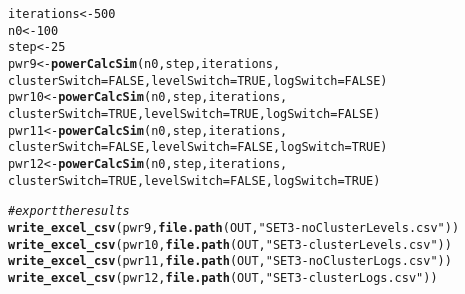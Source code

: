 \documentclass[10pt]{article}\usepackage[]{graphicx}\usepackage[]{color}
\makeatletter
\newcommand{\hlnum}[1]{\textcolor[rgb]{0.686,0.059,0.569}{#1}}%
\newcommand{\hlstr}[1]{\textcolor[rgb]{0.192,0.494,0.8}{#1}}%
\newcommand{\hlcom}[1]{\textcolor[rgb]{0.678,0.584,0.686}{\textit{#1}}}%
\newcommand{\hlstd}[1]{\textcolor[rgb]{0.345,0.345,0.345}{#1}}%
\newcommand{\hlkwb}[1]{\textcolor[rgb]{0.69,0.353,0.396}{#1}}%
\newcommand{\hlkwc}[1]{\textcolor[rgb]{0.333,0.667,0.333}{#1}}%
\newcommand{\hlkwd}[1]{\textcolor[rgb]{0.737,0.353,0.396}{\textbf{#1}}}%
\newenvironment{kframe}{%
 \def\at@end@of@kframe{}%
 \ifinner\ifhmode%
  \def\at@end@of@kframe{\end{minipage}}%
  \begin{minipage}{\columnwidth}%
 \fi\fi%
 \def\FrameCommand##1{\hskip\@totalleftmargin \hskip-\fboxsep
 \colorbox{shadecolor}{##1}\hskip-\fboxsep
     \hskip-\linewidth \hskip-\@totalleftmargin \hskip\columnwidth}%
 \MakeFramed {\advance\hsize-\width
   \@totalleftmargin\z@ \linewidth\hsize
   \@setminipage}}%
 {\par\unskip\endMakeFramed%
 \at@end@of@kframe}
\newenvironment{knitrout}{}{} %
\makeatother
\begin{document}
\begin{knitrout}
\color{fgcolor}\begin{kframe}
\begin{alltt}
\hlstd{iterations} \hlkwb{<-} \hlnum{500}
\hlstd{n0} \hlkwb{<-} \hlnum{100}
\hlstd{step} \hlkwb{<-} \hlnum{25}
\hlstd{pwr9} \hlkwb{<-} \hlkwd{powerCalcSim}\hlstd{(n0,step,iterations,}
                       \hlkwc{clusterSwitch} \hlstd{=} \hlnum{FALSE}\hlstd{,} \hlkwc{levelSwitch} \hlstd{=} \hlnum{TRUE}\hlstd{,}  \hlkwc{logSwitch} \hlstd{=} \hlnum{FALSE}\hlstd{)}
\hlstd{pwr10} \hlkwb{<-} \hlkwd{powerCalcSim}\hlstd{(n0,step,iterations,}
                       \hlkwc{clusterSwitch} \hlstd{=} \hlnum{TRUE}\hlstd{,}  \hlkwc{levelSwitch} \hlstd{=} \hlnum{TRUE}\hlstd{,}  \hlkwc{logSwitch} \hlstd{=} \hlnum{FALSE}\hlstd{)}
\hlstd{pwr11} \hlkwb{<-} \hlkwd{powerCalcSim}\hlstd{(n0,step,iterations,}
                       \hlkwc{clusterSwitch} \hlstd{=} \hlnum{FALSE}\hlstd{,} \hlkwc{levelSwitch} \hlstd{=} \hlnum{FALSE}\hlstd{,} \hlkwc{logSwitch} \hlstd{=} \hlnum{TRUE}\hlstd{)}
\hlstd{pwr12} \hlkwb{<-} \hlkwd{powerCalcSim}\hlstd{(n0,step,iterations,}
                       \hlkwc{clusterSwitch} \hlstd{=} \hlnum{TRUE}\hlstd{,}  \hlkwc{levelSwitch} \hlstd{=} \hlnum{FALSE}\hlstd{,} \hlkwc{logSwitch} \hlstd{=} \hlnum{TRUE}\hlstd{)}
\end{alltt}
\end{kframe}
\end{knitrout}

\begin{knitrout}
\color{fgcolor}\begin{kframe}
\begin{alltt}
\hlcom{# export the results}
\hlkwd{write_excel_csv}\hlstd{(pwr9,} \hlkwd{file.path}\hlstd{(OUT,}\hlstr{"SET3-noClusterLevels.csv"}\hlstd{))}
\hlkwd{write_excel_csv}\hlstd{(pwr10,} \hlkwd{file.path}\hlstd{(OUT,}\hlstr{"SET3-clusterLevels.csv"}\hlstd{))}
\hlkwd{write_excel_csv}\hlstd{(pwr11,} \hlkwd{file.path}\hlstd{(OUT,}\hlstr{"SET3-noClusterLogs.csv"}\hlstd{))}
\hlkwd{write_excel_csv}\hlstd{(pwr12,} \hlkwd{file.path}\hlstd{(OUT,}\hlstr{"SET3-clusterLogs.csv"}\hlstd{))}
\end{alltt}
\end{kframe}
\end{knitrout}
\end{document}
